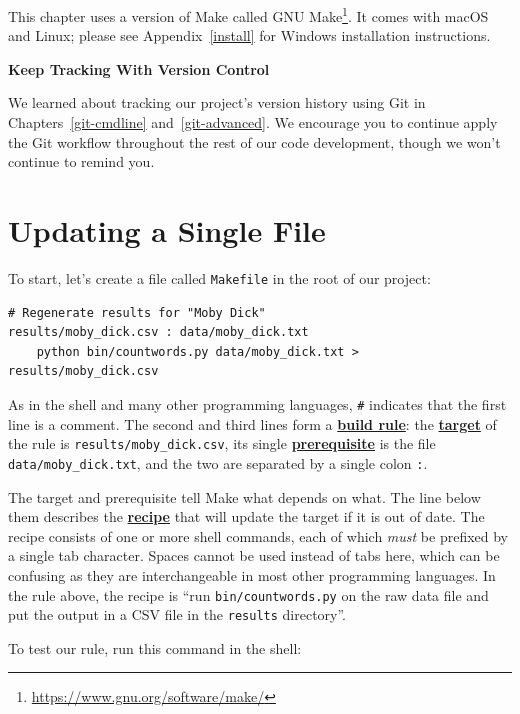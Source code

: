 \documentclass[
]{krantz}
\renewenvironment{quote}{\begin{VF}}{\end{VF}}
\renewcommand{\href}[2]{#2\footnote{\url{#1}}}
\newcommand{\gref}[2]{\hyperlink{#2}{\textbf{#1}}}
\begin{document}
This chapter uses a version of Make called \href{https://www.gnu.org/software/make/}{GNU Make}.
It comes with macOS and Linux;
please see Appendix~\ref{install} for Windows installation instructions.

\begin{quote}
\textbf{Keep Tracking With Version Control}

We learned about tracking our project's version history using Git
in Chapters~\ref{git-cmdline} and~\ref{git-advanced}.
We encourage you to continue apply the Git workflow
throughout the rest of our code development,
though we won't continue to remind you.
\end{quote}

\hypertarget{automate-single-file}{%
\section{Updating a Single File}\label{automate-single-file}}

To start,
let's create a file called \texttt{Makefile} in the root of our project:

\begin{verbatim}
# Regenerate results for "Moby Dick"
results/moby_dick.csv : data/moby_dick.txt
    python bin/countwords.py data/moby_dick.txt > results/moby_dick.csv
\end{verbatim}

As in the shell and many other programming languages,
\texttt{\#} indicates that the first line is a comment.
The second and third lines form a \gref{build rule}{build\_rule}:
the \gref{target}{build\_target} of the rule is \texttt{results/moby\_dick.csv},
its single \gref{prerequisite}{prerequisite} is the file \texttt{data/moby\_dick.txt},
and the two are separated by a single colon \texttt{:}.

The target and prerequisite tell Make what depends on what.
The line below them describes the \gref{recipe}{build\_recipe}
that will update the target if it is out of date.
The recipe consists of one or more shell commands,
each of which \emph{must} be prefixed by a single tab character.
Spaces cannot be used instead of tabs here,
which can be confusing as they are interchangeable in most other programming languages.
In the rule above,
the recipe is ``run \texttt{bin/countwords.py} on the raw data file
and put the output in a CSV file in the \texttt{results} directory''.

To test our rule, run this command in the shell:
\end{document}
